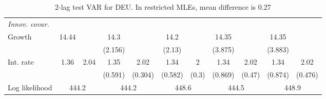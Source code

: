 \begin{table}[htbp]
\begin{tabular}{@{\extracolsep{4pt}}lcccccccccc@{}}
\rule{0pt}{4ex} \emph{Innov. covar.}  	 & 	 & 	 & 	 & 	 & 	 & 	 & 	 & 	 & 	 &\\ 
\quad Growth 	 &14.44 	 &  	 & 14.3 	 &  	 & 14.2 	 &  	 & 14.35 	 &  	 & 14.35 	 & 	 \\ 
 		 &  	 &  	 & (2.156) 	 &  	 & (2.13) 	 &  	 & (3.875) 	 &  	 & (3.883) 	 &  	 \\ 
\quad Int. rate 	 &1.36 	 & 2.04 	 & 1.35 	 & 2.02 	 & 1.34 	 & 2 	 & 1.34 	 & 2.02 	 & 1.34 	 & 2.02	 \\ 
 		 &  	 &  	 & (0.591) 	 & (0.304) 	 & (0.582) 	 & (0.3) 	 & (0.869) 	 & (0.47) 	 & (0.874) 	 & (0.476) 	 \\ 
 \hline \rule{0pt}{4ex} 
  Log likelihood 	 &\multicolumn{2}{c}{444.2} 	 & \multicolumn{2}{c}{444.2} 	 & \multicolumn{2}{c}{448.6} 	 & \multicolumn{2}{c}{444.5} 	 & \multicolumn{2}{c}{448.9}\\ 

 \hline 	\end{tabular}		\caption{2-lag test VAR for DEU. In restricted MLEs, mean difference is 0.27}
		\label{tab:DEU2lag}

\end{table}
